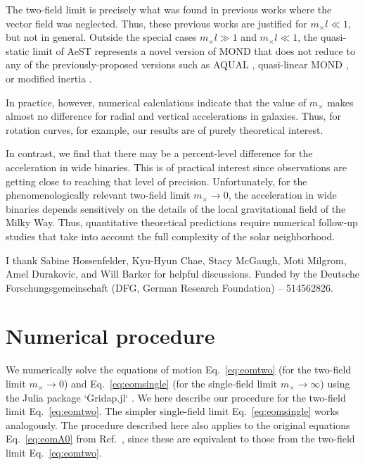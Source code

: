 \documentclass[reprint, amsmath,amssymb, nofootinbib, aps, prd]{revtex4-2}
\begin{document}
The two-field limit is precisely what was found in previous works where the vector field was neglected.
Thus, these previous works are justified for $m_\times l \ll 1$, but not in general.
Outside the special cases $m_\times l \gg 1$ and $m_\times l \ll 1$, the quasi-static limit of AeST represents a novel version of MOND that does not reduce to any of the previously-proposed versions such as AQUAL \citep{Bekenstein1984}, quasi-linear MOND  \citep[QUMOND,][]{Milgrom2010, Milgrom2023}, or modified inertia \citep{Milgrom2022}.

In practice, however, numerical calculations indicate that the value of $m_\times$ makes almost no difference for radial and vertical accelerations in galaxies.
Thus, for rotation curves, for example, our results are of purely theoretical interest.

In contrast, we find that there may be a percent-level difference for the acceleration in wide binaries.
This is of practical interest since observations are getting close to reaching that level of precision.
Unfortunately, for the phenomenologically relevant two-field limit $m_\times \to 0$, the acceleration in wide binaries depends sensitively on the details of the local gravitational field of the Milky Way.
Thus, quantitative theoretical predictions require numerical follow-up studies that take into account the full complexity of the solar neighborhood.

\begin{acknowledgements}
\label{sec:acknowledgements}

I thank Sabine Hossenfelder, Kyu-Hyun Chae, Stacy McGaugh, Moti Milgrom, Amel Durakovic, and Will Barker for helpful discussions.
Funded by the Deutsche Forschungsgemeinschaft (DFG, German Research Foundation) – 514562826.

\end{acknowledgements}


\appendix

\section{Numerical procedure}
\label{sec:appendix:numerics}

We numerically solve the equations of motion Eq.~\eqref{eq:eomtwo} (for the two-field limit $m_\times \to 0$) and Eq.~\eqref{eq:eomsingle} (for the single-field limit $m_\times \to \infty$) using the Julia package `Gridap.jl` \citep{Badia2020, Verdugo2022}.
We here describe our procedure for the two-field limit Eq.~\eqref{eq:eomtwo}.
The simpler single-field limit Eq.~\eqref{eq:eomsingle} works analogously.
The procedure described here also applies to the original equations Eq.~\eqref{eq:eomA0} from Ref.~\cite{Skordis2020}, since these are equivalent to those from the two-field limit Eq.~\eqref{eq:eomtwo}.
\end{document}
